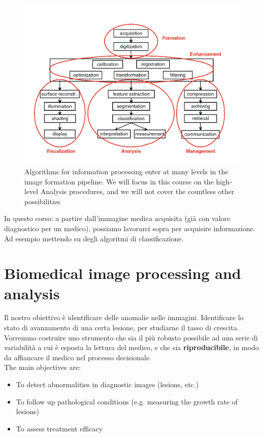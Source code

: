 \begin{figure}[ht]
	\centering
	\includegraphics[width=0.85\linewidth]{figure_med/computers_med_img}
	\caption{Algorithms for
		information processing enter at many levels in the image formation	pipeline. We will focus in this
		course on the high-level Analysis procedures, and
		we will not cover the countless other possibilities}
\end{figure}
\FloatBarrier
In questo corso: a partire dall'immagine medica acquisita (già con valore diagnostico per un medico), possiamo lavorarci sopra per acquisire informazione. Ad esempio mettendo su degli algoritmi di classificazione.\\

\section{Biomedical image processing and analysis}

Il nostro obiettivo è identificare delle anomalie nelle immagini. Identificare lo stato di avanzamento di una certa lesione, per studiarne il tasso di crescita.\\
Vorremmo costruire uno strumento che sia il più robusto possibile ad una serie di variabilità a cui è esposta la lettura del medico, e che sia \textbf{riproducibile}, in modo da affiancare il medico nel processo decisionale.\\

The main objectives are:
\begin{itemize}
	\item To detect abnormalities in diagnostic images (lesions, etc.)
	\item To follow up pathological conditions (e.g. measuring the growth rate of lesions)
	\item To assess treatment efficacy
\end{itemize}


